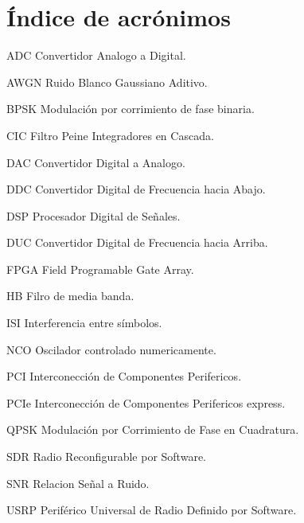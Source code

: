 \chapter*{\'Indice de acr\'onimos}
%

\begin{symbollist*}

\item[ADC]  Convertidor Analogo a Digital.
\item[AWGN] Ruido Blanco Gaussiano Aditivo.
\item[BPSK] Modulaci\'on por corrimiento de fase binaria.
\item[CIC]  Filtro Peine Integradores en Cascada.
\item[DAC]  Convertidor Digital a Analogo.
\item[DDC]  Convertidor Digital de Frecuencia hacia Abajo.
\item[DSP]  Procesador Digital de Se\~nales.
\item[DUC]  Convertidor Digital de Frecuencia hacia Arriba.
\item[FPGA] Field Programable Gate Array.
\item[HB]   Filro de media banda.
\item[ISI]  Interferencia entre s\'imbolos.
\item[NCO]  Oscilador controlado numericamente.
\item[PCI]  Interconecci\'on de Componentes Perifericos.
\item[PCIe] Interconecci\'on de Componentes Perifericos express.
\item[QPSK] Modulaci\'on por Corrimiento de Fase en Cuadratura.
\item[SDR]  Radio Reconfigurable por Software.
\item[SNR]  Relacion Se\~nal a Ruido.
\item[USRP] Perif\'erico Universal de Radio Definido por Software.

\end{symbollist*}